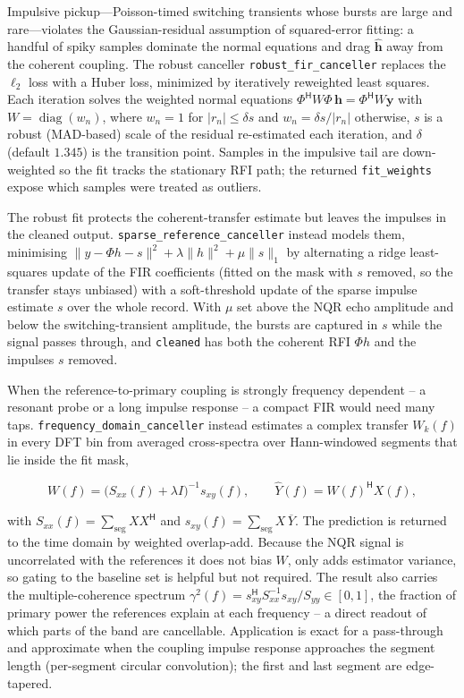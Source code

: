 \documentclass[11pt,oneside]{report}
\newcommand{\code}[1]{\texttt{#1}}
\begin{document}
Impulsive pickup---Poisson-timed switching transients whose bursts are large and
rare---violates the Gaussian-residual assumption of squared-error fitting: a
handful of spiky samples dominate the normal equations and drag
\(\widehat{\mathbf{h}}\) away from the coherent coupling. The robust canceller
\code{robust\_fir\_canceller} replaces the \(\ell_2\) loss with a Huber loss,
minimized by iteratively reweighted least squares. Each iteration solves the
weighted normal equations \(\Phi^{\mathsf H} W \Phi\,\mathbf{h} =
\Phi^{\mathsf H} W \mathbf{y}\) with \(W=\operatorname{diag}(w_n)\), where
\(w_n = 1\) for \(|r_n|\le\delta s\) and \(w_n=\delta s/|r_n|\) otherwise, \(s\)
is a robust (MAD-based) scale of the residual re-estimated each iteration, and
\(\delta\) (default \(1.345\)) is the transition point. Samples in the impulsive
tail are down-weighted so the fit tracks the stationary RFI path; the returned
\code{fit\_weights} expose which samples were treated as outliers.

The robust fit protects the coherent-transfer estimate but leaves the impulses in
the cleaned output. \code{sparse\_reference\_canceller} instead models them,
minimising \(\lVert y - \Phi h - s\rVert^2 + \lambda\lVert h\rVert^2 +
\mu\lVert s\rVert_1\) by alternating a ridge least-squares update of the FIR
coefficients (fitted on the mask with \(s\) removed, so the transfer stays
unbiased) with a soft-threshold update of the sparse impulse estimate \(s\) over
the whole record. With \(\mu\) set above the NQR echo amplitude and below the
switching-transient amplitude, the bursts are captured in \(s\) while the signal
passes through, and \code{cleaned} has both the coherent RFI \(\Phi h\) and the
impulses \(s\) removed.

When the reference-to-primary coupling is strongly frequency dependent -- a
resonant probe or a long impulse response -- a compact FIR would need many taps.
\code{frequency\_domain\_canceller} instead estimates a complex transfer
\(W_k(f)\) in every DFT bin from averaged cross-spectra over Hann-windowed
segments that lie inside the fit mask,

\[
  W(f) = \bigl(S_{xx}(f) + \lambda I\bigr)^{-1} s_{xy}(f),
  \qquad
  \widehat{Y}(f) = W(f)^{\mathsf H} X(f),
\]

with \(S_{xx}(f)=\sum_{\mathrm{seg}} X X^{\mathsf H}\) and
\(s_{xy}(f)=\sum_{\mathrm{seg}} X\,\overline{Y}\). The prediction is returned to
the time domain by weighted overlap-add. Because the NQR signal is uncorrelated
with the references it does not bias \(W\), only adds estimator variance, so
gating to the baseline set is helpful but not required. The result also carries
the multiple-coherence spectrum
\(\gamma^2(f)=s_{xy}^{\mathsf H} S_{xx}^{-1} s_{xy}/S_{yy}\in[0,1]\), the fraction
of primary power the references explain at each frequency -- a direct readout of
which parts of the band are cancellable. Application is exact for a pass-through
and approximate when the coupling impulse response approaches the segment length
(per-segment circular convolution); the first and last segment are edge-tapered.
\end{document}
